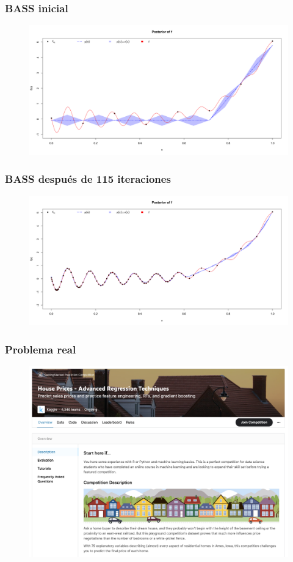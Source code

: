 \documentclass[fleqn]{beamer}
\begin{document}
\begin{frame}
  \frametitle{BASS inicial}
  \begin{figure}[h]
    \centering
    \includegraphics[width=1\textwidth]{Figures/BASS8.png}
    \label{fig:bass8}
  \end{figure}
\end{frame}

\begin{frame}
  \frametitle{BASS después de 115 iteraciones}
  \begin{figure}[h]
    \centering
    \includegraphics[width=1\textwidth]{Figures/115bass.png}
    \label{fig:bass115}
  \end{figure}
\end{frame}

\begin{frame}
  \frametitle{Problema real}
  \begin{figure}[h]
    \centering
    \includegraphics[width=1\textwidth]{Figures/ames.png}
    \label{fig:ames}
  \end{figure}
\end{frame}
\end{document}
